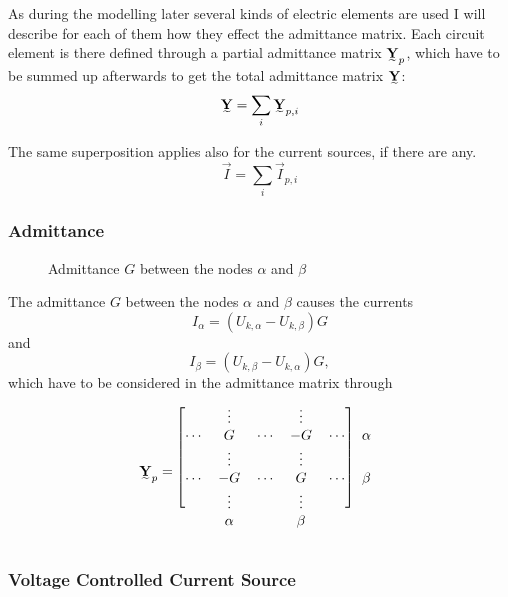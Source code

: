 As during the modelling later several kinds of electric elements are used I will describe for each of them how they effect the admittance matrix. Each circuit element is there defined through a partial admittance matrix $\mat Y_p$, which have to be summed up afterwards to get the total admittance matrix $\mat Y$:
\begin{equation}
	\mat Y = \sum_i \mat Y_{p,i}
\end{equation}

The same superposition applies also for the current sources, if there are any.
\begin{equation}
	\vec I = \sum_i \vec I_{p,i}
\end{equation}

\subsubsection{Admittance}

\begin{figure}
	\centering
	
	\caption{Admittance $G$ between the nodes $\alpha$ and $\beta$}
	\label{fig:admittance}
\end{figure}

The admittance $G$ between the nodes $\alpha$ and $\beta$  causes the currents
\begin{equation}
	I_\alpha = (U_{k,\alpha} - U_{k,\beta}) G
\end{equation}
and
\begin{equation}
	I_\beta = (U_{k,\beta} - U_{k,\alpha}) G,
\end{equation}
which have to be considered in the admittance matrix through
\begin{equation}
	\mat Y_p = 	
	\begin{blockarray}{cccccc}
		\begin{block}{[ccccc]c}
		 		& \vdots	&			& \vdots	&			& \\
		\cdots	& G			& \cdots	& -G		& \cdots	& \alpha \\
		 		& \vdots	&			& \vdots	&			& \\
		\cdots	& -G		& \cdots	& G			& \cdots	& \beta \\
		 		& \vdots	&			& \vdots	&			& \\
		\end{block}
				& \alpha	&			& \beta		&			& 
	\end{blockarray}
\end{equation}

\subsubsection{Voltage Controlled Current Source}

